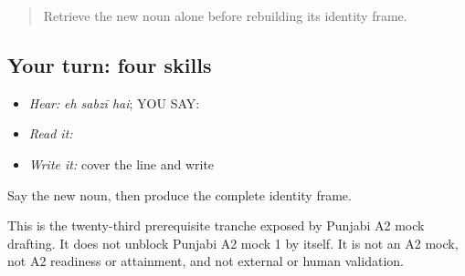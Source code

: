 \label{lesson:PA-C200-payoff}



\begin{quote}
Retrieve the new noun alone before rebuilding its identity frame.
\end{quote}

\subsection*{Your turn: four skills}
\begin{itemize}
\raggedright
  \item \emph{Hear:} \emph{eh sabzī hai}; YOU SAY: \textbf{  }
  \item \emph{Read it:} \textbf{  }
  \item \emph{Write it:} cover the line and write \textbf{  }
\end{itemize}

\begin{tcolorbox}[breakable,colback=teal!4,colframe=teal!35!black,title={Before you move on}]
Say the new noun, then produce the complete identity frame.

This is the twenty-third prerequisite tranche exposed by Punjabi A2 mock drafting. It does not unblock Punjabi A2 mock 1 by itself. It is not an A2 mock, not A2 readiness or attainment, and not external or human validation.
\end{tcolorbox}
